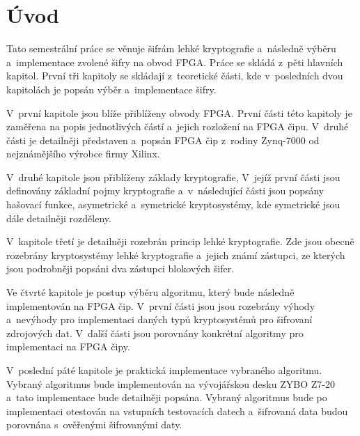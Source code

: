 \chapter*{Úvod}
{}
Tato semestrální práce se věnuje šifrám lehké kryptografie a~následně výběru a~implementace zvolené šifry na obvod FPGA. Práce se skládá z~pěti hlavních kapitol. První tři kapitoly se skládají z~teoretické části, kde v~posledních dvou kapitolách je popsán výběr a~implementace šifry. 

V~první kapitole jsou blíže přiblíženy obvody FPGA. První části této kapitoly je zaměřena na popis jednotlivých částí a~jejich rozložení na FPGA čipu. V~druhé části je detailněji představen a~popsán FPGA čip z~rodiny Zynq-7000 od nejznámějšího výrobce firmy Xilinx.

V~druhé kapitole jsou přiblíženy základy kryptografie, V~jejíž první části jsou definovány základní pojmy kryptografie a~v~následující části jsou popsány hašovací funkce, asymetrické a~symetrické kryptosystémy, kde symetrické jsou dále detailněji rozděleny.

V~kapitole třetí je detailněji rozebrán princip lehké kryptografie. Zde jsou obecně rozebrány kryptosystémy lehké kryptografie a~jejich známí zástupci, ze kterých jsou podrobněji popsáni dva zástupci blokových šifer.

Ve čtvrté kapitole je postup výběru algoritmu, který bude následně implementován na FPGA čip. V~první části jsou jsou rozebrány výhody a~nevýhody pro implementaci daných typů kryptosystémů pro šifrovaní zdrojových dat. V~další části jsou porovnány konkrétní algoritmy pro implementaci na FPGA čipy.

V~poslední páté kapitole je praktická implementace vybraného algoritmu. Vybraný algoritmus bude implementován na vývojářskou desku ZYBO Z7-20 a~tato implementace bude detailněji popsána. Vybraný algoritmus bude po implementaci otestován na vstupních testovacích datech a~šifrovaná data budou porovnána s~ověřenými šifrovanými daty.

